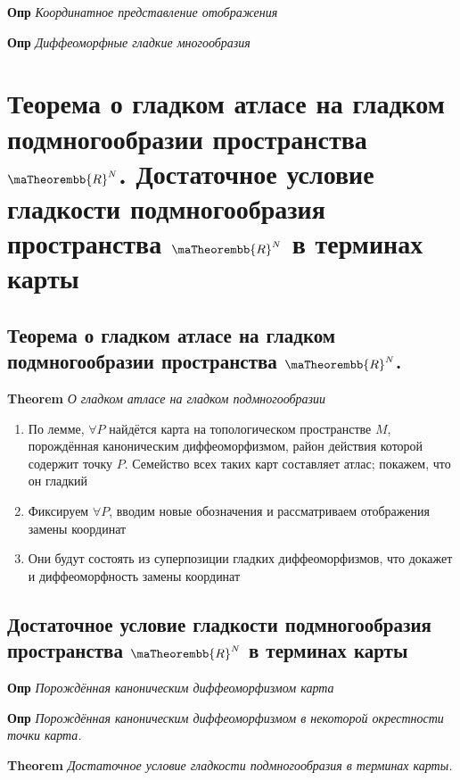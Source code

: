 \documentclass[a4paper, 14pt]{article}
\begin{document}
    \textbf{Опр} \textit{Координатное представление отображения}
    
    \textbf{Опр} \textit{Диффеоморфные гладкие многообразия}
    
    \section{Теорема о гладком атласе на гладком подмногообразии пространства $\maTheorembb{R}^N$.
    Достаточное условие гладкости подмногообразия пространства $\maTheorembb{R}^N$ в терминах карты}
    
    \subsection{Теорема о гладком атласе на гладком подмногообразии пространства $\maTheorembb{R}^N$.}
    
    \textbf{Theorem} \textit{О гладком атласе на гладком подмногообразии}
    
    \begin{enumerate}
        \item По лемме, $\forall P$ найдётся карта на топологическом пространстве $M$, порождённая каноническим
        диффеоморфизмом, район действия которой содержит точку $P$.
        Семейство всех таких карт составляет атлас; покажем, что он гладкий
        \item Фиксируем $\forall P$, вводим новые обозначения и рассматриваем отображения замены координат
        \item Они будут состоять из суперпозиции гладких диффеоморфизмов, что докажет и диффеоморфность замены координат
    \end{enumerate}
    
    \subsection{Достаточное условие гладкости подмногообразия пространства $\maTheorembb{R}^N$ в терминах карты}
    
    \textbf{Опр} \textit{Порождённая каноническим диффеоморфизмом карта}
    
    \textbf{Опр} \textit{Порождённая каноническим диффеоморфизмом в некоторой окрестности точки карта.}
    
    \textbf{Theorem} \textit{Достаточное условие гладкости подмногообразия в терминах карты.}
    
\end{document}
